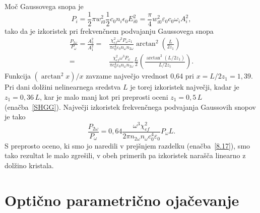 Moč Gaussovega snopa je
\begin{equation}
P_{i}=\frac{1}{2}\pi w_{i0}^{2} \frac{1}{2}c_0 n_i \epsilon_{0}E_{i0}^{2}=
\frac{\pi}{4}w_{i0}^{2}\varepsilon_0 c_0 \omega_{i} A_{i}^{2},
\label{8.26}
\end{equation}
tako da je izkoristek pri frekvenčnem podvajanju Gaussovega snopa 
\begin{equation}
\begin{aligned}
\frac{P_{2\omega}}{P_{\omega}}=\frac{A_3^2}{A_1^2}  = &
\frac{\chi_{ef}^2 \omega^3 P_\omega z_1}{\pi c_0^4 \varepsilon_0 n_\omega n_{2\omega}} 
\arctan^2 \left( \frac{L}{2z_1}\right) \\
 = &\frac{\chi_{ef}^2 \omega^3 P_\omega}{\pi c_0^4 \varepsilon_0 n_\omega n_{2\omega}} \frac{L}{2}
\left(\frac {\arctan^2 \left( L/2z_1\right)}{L/2z_1}\right).
\label{8.27}
\end{aligned}
\end{equation}
Funkcija $(\arctan^{2}x)/x$ zavzame največjo vrednost 0,64 pri $x =L/2z_1=1,39$.
Pri dani dolžini nelinearnega sredstva $L$ je torej 
izkoristek največji, kadar je $z_{1}=0,36\,L$, kar je malo manj kot pri
preprosti oceni $z_{1}=0,5\,L$ (enačba~\ref{SHGG}). Največji izkoristek
frekvenčnega podvajanja Gaussovih snopov je tako
\begin{equation}
\frac{P_{2\omega}}{P_{\omega}}
= 0,64 \frac{\omega^3 \chi_{ef}^2}{2\pi n_{2\omega} n_{\omega} c_0^4 \varepsilon_0 } P_\omega L.
\label{8.28}
\end{equation}
S preprosto oceno, ki smo jo naredili v prejšnjem razdelku (enačba~\ref{8.17}), smo tako 
rezultat le malo zgrešili, v obeh primerih pa izkoristek narašča linearno z dolžino kristala.

\section{Optično parametrično ojačevanje}

